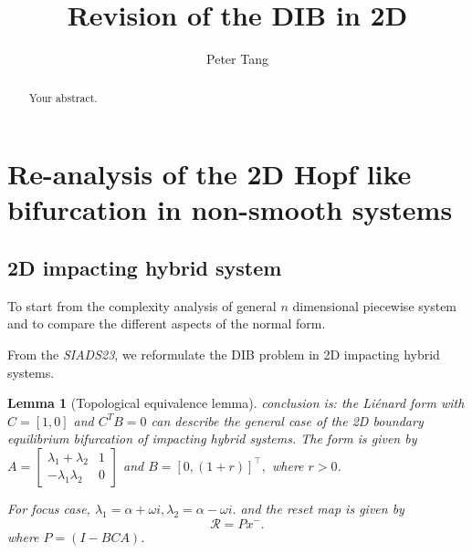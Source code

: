 \documentclass{article}
\title{Revision of the DIB in 2D }
\author{Peter Tang}
\newtheorem{lemma}[theorem]{Lemma}
\begin{document}
\maketitle

\begin{abstract}
Your abstract.
\end{abstract}


\section{Re-analysis of the 2D Hopf like bifurcation in non-smooth systems}
\subsection{2D impacting hybrid system}
\label{sec:2D_IHS}

To start from the complexity analysis of general $n$ dimensional piecewise system and to compare the different aspects of the normal form.

From the \emph{SIADS23}, we reformulate the DIB  problem in 2D impacting hybrid systems.

\begin{lemma}[Topological equivalence lemma]
	conclusion is: the Li\'enard form with $C = [1,0]$ and $C^TB = 0$ can describe the general case of the 2D boundary equilibrium bifurcation of impacting hybrid systems.
	The form is given by
	$
	A = \begin{bmatrix}
		\lambda_1 + \lambda_2 & 1 \\
		-\lambda_1 \lambda_2 & 0
		\end{bmatrix}
	$
	and 
	$
	B = [0, (1+r)]^{\top},
	$
where $r>0$.

For focus case,
$
\lambda_1 = \alpha + \omega i, \lambda_2 = \alpha - \omega i.
$
and the reset map is given by 
$$
\mathcal{R} =Px^-.
$$
where 
$ P= (I - BCA)$.

\label{lemma:2D canonical form lemma}
\end{lemma}
\end{document}

